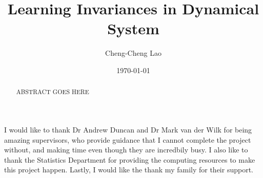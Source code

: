 \documentclass{statsmsc}
\title{Learning Invariances in Dynamical System}
\author{Cheng-Cheng Lao}
\date{\today}
\begin{document}
\maketitle


\declarationdate{\today}
\declaration 


\begin{abstract}
    ABSTRACT GOES HERE
\end{abstract}

\begin{acknowledgements}
I would like to thank Dr Andrew Duncan and Dr Mark van der Wilk for being amazing supervisors, who provide guidance that I cannot complete the project without, and making time even though they are incredbily busy. 
I also like to thank the Statistics Department for providing the computing resources to make this project happen.
Lastly, I would like the thank my family for their support.

\end{acknowledgements}


\mainmatter
\end{document}
